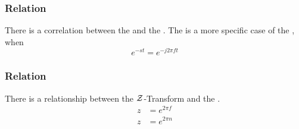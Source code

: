 \subsubsection{  Relation}\label{subsubsec:Laplace-Transform_Fourier_Transform_Relation}
There is a correlation between the  and the .
The  is a more specific case of the , when
\begin{equation*}
  e^{-st} = e^{-j 2\pi ft}
\end{equation*}

\subsubsection{\texorpdfstring{  Relation}{Z-Transform Fourier Transform Relation}}\label{subsubsec:ZTransformFourierTransformRelation}
There is a relationship between the $\operatorname{\mathcal{Z}}$-Transform and the .
\begin{equation}\label{eq:ZTransformFourierTransformRelation}
  \begin{aligned}
    z &= e^{2\pi f} \\
    z &= e^{2\pi n} \\
  \end{aligned}
\end{equation}

